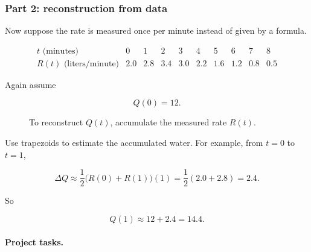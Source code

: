\subsubsection*{Part 2: reconstruction from data}

Now suppose the rate is measured once per minute instead of given by a formula.

\[
\begin{array}{c|ccccccccc}
t\text{ (minutes)} & 0 & 1 & 2 & 3 & 4 & 5 & 6 & 7 & 8 \\ \hline
R(t)\text{ (liters/minute)} & 2.0 & 2.8 & 3.4 & 3.0 & 2.2 & 1.6 & 1.2 & 0.8 & 0.5
\end{array}
\]

Again assume

\[
Q(0)=12.
\]

\begin{figure}[h]
\centering
{}
\caption{To reconstruct \(Q(t)\), accumulate the measured rate \(R(t)\).}
\label{fig:reconstruct-from-rate-data}
\end{figure}

Use trapezoids to estimate the accumulated water.  For example, from \(t=0\) to
\(t=1\),

\[
\Delta Q
\approx
\frac12\bigl(R(0)+R(1)\bigr)(1)
=
\frac12(2.0+2.8)
=
2.4.
\]

So

\[
Q(1)\approx 12+2.4=14.4.
\]

\paragraph{Project tasks.}

